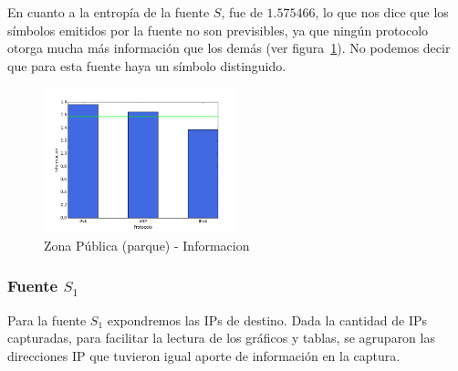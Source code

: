 \documentclass[final,inline,narroweqnarray,a4paper]{ieee}
\begin{document}
En cuanto a la entropía de la fuente $S$, fue de $1.575466$, lo que nos dice que los símbolos emitidos por la fuente no son previsibles, ya que ningún protocolo otorga mucha más información que los demás (ver figura~\ref{histo:parqueS}). No podemos decir que para esta fuente haya un símbolo distinguido.

\begin{figure}[H]
    \begin{center}
        \includegraphics[width=0.5\textwidth]{plot/parqueS-bar.png}
        \caption{Zona Pública (parque) - Informacion}
        \label{histo:parqueS}
    \end{center}
\end{figure}

\subsubsection{Fuente $S_1$}

Para la fuente $S_1$ expondremos las IPs de destino. Dada la cantidad de IPs capturadas, para facilitar la lectura de los gráficos y tablas, se agruparon las direcciones IP que tuvieron igual aporte de información en la captura.
\end{document}
